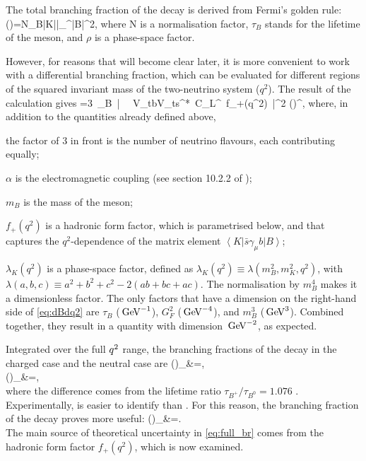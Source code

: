 The total branching fraction of the \BKnn decay is derived from Fermi's golden rule:
\be
\mathrm{\Br}(\BKnn)=N\tau_{B}\left|\left\langle K\nu\bar{\nu}\right|_{}^{}\left|B\right\rangle\right|^2\rho,
\ee
where N is a normalisation factor, $\tau_{B}$ stands for the lifetime of the \B meson, and $\rho$ is a phase-space factor.

However, for reasons that will become clear later, it is more convenient to work with a differential branching fraction, which can be evaluated for different regions of the squared invariant mass of the two-neutrino system ($q^2$).
The result of the calculation gives \cite{Buras:2014fpa}
\be \label{eq:dBdq2}
=3\,
\tau_{B}\,
\left|
\,
\,
V_{tb}V_{ts}^*\,
C_L^{}\,
f_+(q^2)\,
\right|^2
\left(\right)^{},
\ee
where, in addition to the quantities already defined above,
\bi
\item the factor of 3 in front is the number of neutrino flavours, each contributing equally;
\item $\alpha$ is the electromagnetic coupling (see section 10.2.2 of \cite{ParticleDataGroup:2020ssz});
\item $m_B$ is the mass of the \B meson;
\item $f_+(q^2)$ is a hadronic form factor, which is parametrised below, and that captures the $q^2$-dependence of the matrix element $\left\langle K\right|\bar{s}\gamma_{\mu}b\left|B\right\rangle$;
\item $\lambda_K(q^2)$ is a phase-space factor, defined as $\lambda_K(q^2)\equiv\lambda(m_B^2,m_K^2,q^2)$, with $\lambda(a,b,c)\equiv a^2+b^2+c^2-2(ab+bc+ac)$. The normalisation by $m_B^4$ makes it a dimensionless factor.
\ei
The only factors that have a dimension on the right-hand side of \cref{eq:dBdq2} are $\tau_{B}$ ($\mathrm{\,Ge\kern -0.1em V}^{-1}$), $G_F^2$ ($\mathrm{\,Ge\kern -0.1em V}^{-4}$), and $m_B^3$ ($\mathrm{\,Ge\kern -0.1em V}^3$). Combined together, they result in a quantity with dimension $\mathrm{\,Ge\kern -0.1em V}^{-2}$, as expected.

Integrated over the full $q^2$ range, the branching fractions of the decay in the charged case and the neutral case are \cite{BLAKE201750}
\ba \label{eq:full_br}
\Br(\BKpnn)_{}&=, \\
\Br(\BKzznn)_{}&=, \\
\ea
where the difference comes from the lifetime ratio $\tau_{B^+}/\tau_{B^0}=1.076$ \cite{ParticleDataGroup:2020ssz}.
Experimentally, \KS is easier to identify than \KL.
For this reason, the branching fraction of the \BKznn decay proves more useful:
\ba \label{eq:br_kshort}
\Br(\BKznn)_{}&=. \\
\ea
The main source of theoretical uncertainty in \cref{eq:full_br} comes from the hadronic form factor $f_+(q^2)$, which is now examined.
